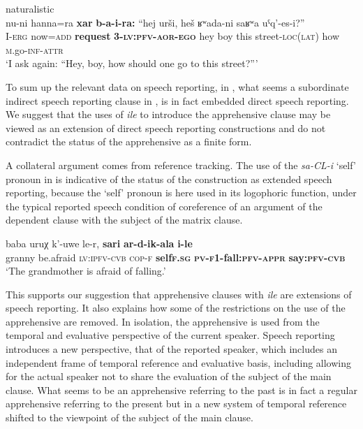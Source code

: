\documentclass[output=paper,colorlinks,citecolor=brown]{langscibook}
\begin{document}
\ea \label{ex:DD54} \textnormal{naturalistic} \\
\gll nu-ni hanna=ra \textbf{xar} \textbf{b-a-i-ra:} ``hej urši, heš ʁʷada-ni saʁʷa uˤq'-es-i?'' \\
I-\textsc{erg} now=\textsc{add} \textbf{request} \textbf{3-\textsc{lv:pfv-aor-ego}} hey boy this street-\textsc{loc(lat)} how \textsc{m}.go-\textsc{inf-attr} \\
\glt `I ask again: ``Hey, boy, how should one go to this street?''{}'
\z


 To sum up the relevant data on speech reporting, in , what seems a subordinate indirect speech reporting clause in , is in fact embedded direct speech reporting. We suggest that the uses of \textit{ile} to introduce the apprehensive clause may be viewed as an extension of direct speech reporting constructions and do not contradict the status of the apprehensive as a finite form. 

A collateral argument comes from reference tracking. The use of the \textit{sa-CL-i} `self' pronoun in  is indicative of the status of the construction as extended speech reporting, because the `self' pronoun is here used in its logophoric function, under the typical reported speech condition of coreference of an argument of the dependent clause with the subject of the matrix clause.


\ea \label{ex:DD55}
\gll baba uruχ k'-uwe le-r, \textbf{sa{\textlangle}r{\textrangle}i} \textbf{ar-d-ik-ala} \textbf{i-le} \\
granny be.afraid \textsc{lv:ipfv-cvb} \textsc{cop-f} \textbf{self{\textlangle}\textsc{f.sg}{\textrangle}} \textbf{\textsc{pv-f1}-fall:\textsc{pfv-appr}} \textbf{say:\textsc{pfv-cvb}} \\
\glt `The grandmother is afraid of falling.'
\z


This supports our suggestion that apprehensive clauses with \textit{ile} are extensions of speech reporting. It also explains how some of the restrictions on the use of the apprehensive are removed. In isolation, the apprehensive is used from the temporal and evaluative perspective of the current speaker. Speech reporting introduces a new perspective, that of the reported speaker, which includes an independent frame of temporal reference and evaluative basis, including allowing for the actual speaker not to share the evaluation of the subject of the main clause. What seems to be an apprehensive referring to the past is in fact a regular apprehensive referring to the present but in a new system of temporal reference shifted to the viewpoint of the subject of the main clause. 
\end{document}
